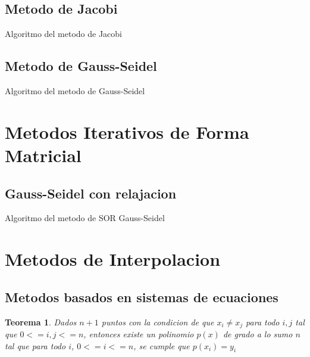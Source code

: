 \documentclass[12pt]{article}
\newtheorem{theorem}{Teorema}[section]
\begin{document}
        \subsection{Metodo de Jacobi}
        
        \begin{algorithm}[H]
            \caption{Algoritmo del metodo de Jacobi}
            
        \end{algorithm}

        \subsection{Metodo de Gauss-Seidel}
        
        
        \begin{algorithm}[H]
            \caption{Algoritmo del metodo de Gauss-Seidel}
            
        \end{algorithm}


        \section{Metodos Iterativos de Forma Matricial}

        \subsection{Gauss-Seidel con relajacion}
        \begin{algorithm}[H]
            \caption{Algoritmo del metodo de SOR Gauss-Seidel}
            
        \end{algorithm}

        \section{Metodos de Interpolacion}

        \subsection{Metodos basados en sistemas de ecuaciones}
        \begin{theorem}
            Dados $n + 1$ puntos con la condicion de que $x_{i} \neq x_{j}$ para todo $i, j$ tal que $0 <= i, j <= n$, entonces existe un polinomio $p(x)$ de grado a lo sumo $n$ tal que para todo $i$, $0 <= i <= n$, se cumple que $p(x_{i}) = y_{i}$
        \end{theorem}
\end{document}
